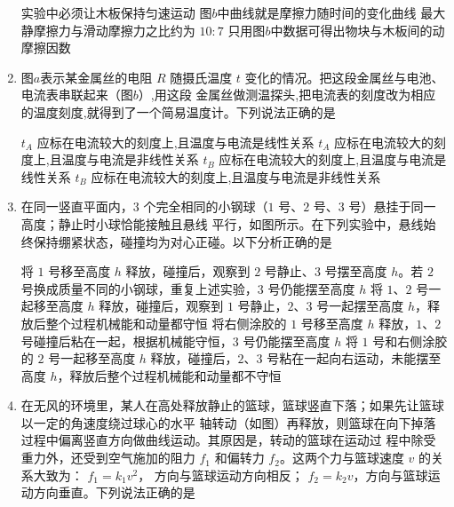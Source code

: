 \begin{enumerate}
\fourchoices
{实验中必须让木板保持匀速运动}
{图$ b $中曲线就是摩擦力随时间的变化曲线}
{最大静摩擦力与滑动摩擦力之比约为 $ 10:7 $}
{只用图$ b $中数据可得出物块与木板间的动摩擦因数}


\item 
图$ a $表示某金属丝的电阻 $ R $ 随摄氏温度 $ t $ 变化的情况。把这段金属丝与电池、电流表串联起来（图$ b $）,用这段
金属丝做测温探头,把电流表的刻度改为相应的温度刻度,就得到了一个简易温度计。下列说法正确的是  
\begin{figure}[h!]
\centering
\begin{subfigure}{0.4\linewidth}
\centering
 
\caption{}\label{}
\end{subfigure}
\begin{subfigure}{0.4\linewidth}
\centering
 
\caption{}\label{}
\end{subfigure}
\end{figure}

\fourchoices
{$ t_{A} $ 应标在电流较大的刻度上,且温度与电流是线性关系}
{$ t_{A} $ 应标在电流较大的刻度上,且温度与电流是非线性关系}
{$ t_{B} $ 应标在电流较大的刻度上,且温度与电流是线性关系}
{$ t_{B} $ 应标在电流较大的刻度上,且温度与电流是非线性关系}



\item
在同一竖直平面内，$ 3 $ 个完全相同的小钢球（$ 1 $ 号、$ 2 $ 号、$ 3 $ 号）悬挂于同一高度；静止时小球恰能接触且悬线
平行，如图所示。在下列实验中，悬线始终保持绷紧状态，碰撞均为对心正碰。以下分析正确的是  
\begin{figure}[h!]
\centering

\end{figure}


\fourchoices
{将 $ 1 $ 号移至高度 $ h $ 释放，碰撞后，观察到 $ 2 $ 号静止、$ 3 $ 号摆至高度 $ h $。若 $ 2 $ 号换成质量不同的小钢球，重复上述实验，$ 3 $ 号仍能摆至高度 $ h $}
{将 $ 1 $、$ 2 $ 号一起移至高度 $ h $ 释放，碰撞后，观察到 $ 1 $ 号静止，$ 2 $、$ 3 $ 号一起摆至高度 $ h $，释放后整个过程机械能和动量都守恒}
{将右侧涂胶的 $ 1 $ 号移至高度 $ h $ 释放，$ 1 $、$ 2 $ 号碰撞后粘在一起，根据机械能守恒，$ 3 $ 号仍能摆至高度 $ h $}
{将 $ 1 $ 号和右侧涂胶的 $ 2 $ 号一起移至高度 $ h $ 释放，碰撞后，$ 2 $、$ 3 $ 号粘在一起向右运动，未能摆至高度 $ h $，释放后整个过程机械能和动量都不守恒}


\item
在无风的环境里，某人在高处释放静止的篮球，篮球竖直下落；如果先让篮球以一定的角速度绕过球心的水平
轴转动（如图）再释放，则篮球在向下掉落过程中偏离竖直方向做曲线运动。其原因是，转动的篮球在运动过
程中除受重力外，还受到空气施加的阻力 $ f_{1} $ 和偏转力 $ f_{2} $。这两个力与篮球速度 $ v $ 的关系大致为： $ f_{1} = k_1 v^{2} $，
方向与篮球运动方向相反； $ f_{2} = k_2v $，方向与篮球运动方向垂直。下列说法正确的是  
\begin{figure}[h!]
\centering

\end{figure}



\end{enumerate}
